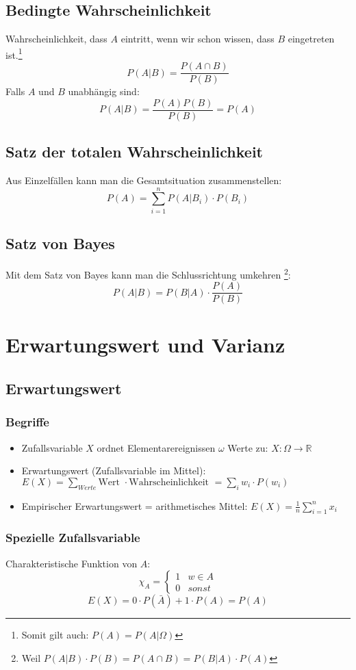 \subsection{Bedingte Wahrscheinlichkeit}
Wahrscheinlichkeit, dass $A$ eintritt, wenn wir schon wissen, dass $B$
eingetreten ist.\footnote{Somit gilt auch: $P(A) = P(A|\Omega)$}
\[ P(A|B) = \frac{P(A \cap B)}{P(B)} \]
Falls $A$ und $B$ unabhängig sind:
\[ P(A|B) = \frac{P(A) P(B)}{P(B)} = P(A) \]

\subsection{Satz der totalen Wahrscheinlichkeit}
Aus Einzelfällen kann man die Gesamtsituation zusammenstellen:
\[ P(A) = \sum_{i=1}^{n}P(A|B_i) \cdot P(B_i) \]

\subsection{Satz von Bayes}
Mit dem Satz von Bayes kann man die Schlussrichtung umkehren
\footnote{Weil $P(A|B) \cdot P(B) = P(A \cap B) = P(B|A) \cdot P(A)$}:
\[ P(A|B) = P(B|A) \cdot \frac{P(A)}{P(B)} \]

\section{Erwartungswert und Varianz}
\subsection{Erwartungswert}
\subsubsection{Begriffe}
\begin{itemize}
  \item Zufallsvariable $X$ ordnet Elementarereignissen $\omega$ Werte
    zu: $X: \Omega \rightarrow \mathbb{R}$
  \item Erwartungswert (Zufallsvariable im Mittel): \\
    $E(X) = \sum_{Werte} \text{Wert } \cdot
    \text{Wahrscheinlichkeit } = \sum_i w_i \cdot P(w_i)$
  \item Empirischer Erwartungswert = arithmetisches Mittel:
    $E(X) = \frac{1}{n} \sum_{i=1}^n x_i$
\end{itemize}
\subsubsection{Spezielle Zufallsvariable}
Charakteristische Funktion von $A$:
\[ \chi_A = \begin{cases}1 & w \in A \\ 0 & sonst \end{cases} \]
\[ E(X) = 0 \cdot P(\bar{A}) + 1 \cdot P(A) = P(A) \]


